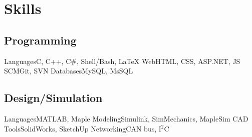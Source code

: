 \section{Skills}

\subsection
	{Programming}
\cvcomputer
	{Languages}{C, C++, C\#, Shell/Bash, \LaTeX{}}
    {Web}{HTML, CSS, ASP.NET, JS}
\cvcomputer
	{SCM}{Git, SVN}
    {Databases}{MySQL, MsSQL}

\subsection
	{Design/Simulation}
\cvcomputer
	{Languages}{MATLAB, Maple}
	{Modeling}{Simulink, SimMechanics, MapleSim}
\cvcomputer
	{CAD Tools}{SolidWorks, SketchUp}
	{Networking}{CAN bus, I$^2$C}
